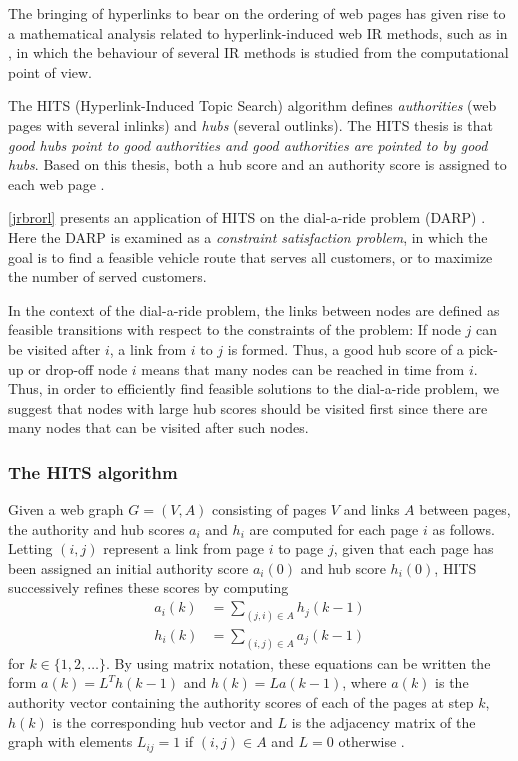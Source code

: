 \documentclass[dissertation,draft*]{aaltoseries}
\begin{document}
The bringing of hyperlinks to bear on the ordering of web pages has given rise to
a mathematical analysis related to hyperlink-induced web IR methods, such as in
\cite{farahat, langville, ng, agosti}, in which the 
behaviour of several IR methods is studied from the computational point of view.

The HITS (Hyperlink-Induced Topic Search) algorithm defines \emph{authorities} 
(web pages with several inlinks) and \emph{hubs} (several outlinks). 
The HITS thesis is that \emph{good hubs point to good authorities and good authorities
are pointed to by good hubs}. Based on this thesis, both a hub score and an authority score is assigned to
each web page \cite{langville}. 

\ref{jrbrorl} presents an application of HITS on the dial-a-ride problem (DARP)
\cite{berbegliathesis,berbegliahybrid,berbegliafeas}.
Here the DARP is examined as a \emph{constraint satisfaction problem}, in which the goal
is to find a feasible vehicle route that serves all customers, or to maximize the number of served customers.

In the context of the dial-a-ride problem, 
the links between nodes are defined as feasible transitions with respect to the %
constraints of the problem: If node $j$ can be visited after $i$, a link from $i$ to $j$ 
is formed. Thus, a good hub score of a pick-up or drop-off node $i$ means 
that many nodes can be reached in time from $i$. 
Thus, in order to efficiently find feasible solutions to the dial-a-ride problem, we suggest that nodes with large 
hub scores should be visited first since there are many nodes that can
be visited after such nodes. 


\subsubsection{The HITS algorithm \cite{kleinberg}}
\label{hits}
Given a web graph $G = (V,A)$ consisting of pages $V$ and links $A$ between pages,
the authority and hub scores $a_i$ and $h_i$ are computed for each page $i$ as follows.
Letting 
$(i,j)$ represent a link from page $i$ to page $j$, given that each page has been 
assigned an initial authority score $a_i(0)$ and hub score $h_i(0)$, HITS successively
refines these scores by computing
\begin{align*}
a_i(k) & = \sum_{(j,i) \in A} h_j(k-1) \\
h_i(k) & = \sum_{(i,j) \in A} a_j(k-1)
\end{align*}
for $k \in \{1,2,\ldots\}$. By using matrix notation, these equations can be written the form 
$a(k) = L^T h(k-1)$ and $h(k) = L a(k-1)$,
where $a(k)$ is the authority vector containing the authority scores of
each of the pages at step $k$, $h(k)$ is the corresponding hub vector and
$L$ is the adjacency matrix of the graph with elements $L_{ij} = 1$ if
$(i,j) \in A$ and $L=0$ otherwise \cite{langville}. 
\end{document}
